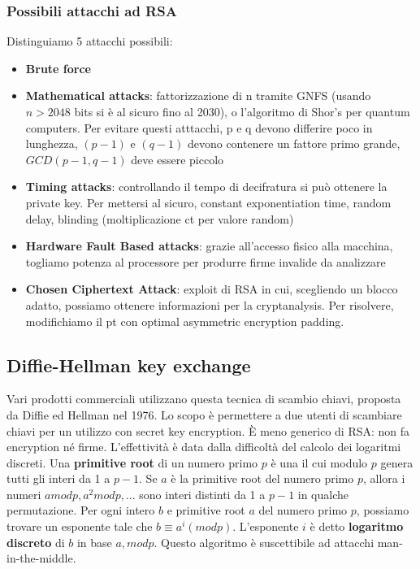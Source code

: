 \documentclass[11pt]{article}
\begin{document}
\subsubsection{Possibili attacchi ad RSA}
Distinguiamo 5 attacchi possibili:
\begin{itemize}
    \item \textbf{Brute force}
    \item \textbf{Mathematical attacks}: fattorizzazione di n tramite GNFS (usando $n>2048$ bits si è al sicuro fino al 2030), o l'algoritmo di Shor's per quantum computers. Per evitare questi atttacchi, p e q devono differire poco in lunghezza, $(p-1)$ e $(q-1)$ devono contenere un fattore primo grande, $GCD(p-1,q-1)$ deve essere piccolo
    \item \textbf{Timing attacks}: controllando il tempo di decifratura si può ottenere la private key. Per mettersi al sicuro, constant exponentiation time, random delay, blinding (moltiplicazione ct per valore random)
    \item \textbf{Hardware Fault Based attacks}: grazie all'accesso fisico alla macchina, togliamo potenza al processore per produrre firme invalide da analizzare
    \item \textbf{Chosen Ciphertext Attack}: exploit di RSA in cui, scegliendo un blocco adatto, possiamo ottenere informazioni per la cryptanalysis. Per risolvere, modifichiamo il pt con optimal asymmetric encryption padding.
\end{itemize}

\subsection{Diffie-Hellman key exchange}
Vari prodotti commerciali utilizzano questa tecnica di scambio chiavi, proposta da Diffie ed Hellman nel 1976. Lo scopo è permettere a due utenti di scambiare chiavi per un utilizzo con secret key encryption. È meno generico di RSA: non fa encryption né firme. L'effettività è data dalla difficoltà del calcolo dei logaritmi discreti.
Una \textbf{primitive root} di un numero primo $p$ è una il cui modulo $p$ genera tutti gli interi da 1 a $p-1$.
Se $a$ è la primitive root del numero primo $p$, allora i numeri $a mod p, a^2 mod p,...$ sono interi distinti da 1 a $p-1$ in qualche permutazione. Per ogni intero $b$ e primitive root $a$ del numero primo $p$, possiamo trovare un esponente tale che $b \equiv a^i (mod p)$. L'esponente $i$ è detto \textbf{logaritmo discreto} di $b$ in base $a, mod p$.
Questo algoritmo è suscettibile ad attacchi man-in-the-middle.
\end{document}
